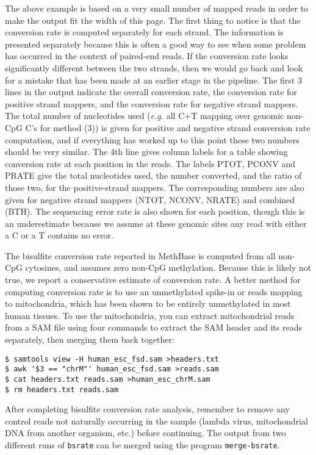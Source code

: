 \documentclass[10pt]{article}
\newcommand{\prog}[1]{\texttt{#1}}
\begin{document}
\noindent
The above example is based on a very small number of mapped reads in
order to make the output fit the width of this page.  The first thing
to notice is that the conversion rate is computed separately for each
strand. The information is presented separately because this is often
a good way to see when some problem has occurred in the context of
paired-end reads. If the conversion rate looks significantly different
between the two strands, then we would go back and look for a mistake
that has been made at an earlier stage in the pipeline. The first 3
lines in the output indicate the overall conversion rate, the
conversion rate for positive strand mappers, and the conversion rate
for negative strand mappers. The total number of nucleotides used
({\em e.g.} all C+T mapping over genomic non-CpG C's for method (3)) is
given for positive and negative strand conversion rate computation,
and if everything has worked up to this point these two numbers should
be very similar. The 4th line gives column labels for a table showing
conversion rate at each position in the reads.  The labels PTOT, PCONV
and PRATE give the total nucleotides used, the number converted, and
the ratio of those two, for the positive-strand mappers. The
corresponding numbers are also given for negative strand mappers
(NTOT, NCONV, NRATE) and combined (BTH). The sequencing error rate is
also shown for each position, though this is an underestimate because
we assume at these genomic sites any read with either a C or a T
contains no error.

The bisulfite conversion rate reported in MethBase is computed from all
non-CpG cytosines, and assumes zero non-CpG methylation. Because this is
likely not true, we report a conservative estimate of conversion rate. A
better method for computing conversion rate is to use an unmethylated
spike-in or reads mapping to mitochondria, which has been shown to be
entirely unmethylated in most human tissues. To use the mitochondria,
you can extract mitochondrial reads from a SAM file using four
commands to extract the SAM header and its reads separately, then merging them
back together:

\begin{verbatim}
$ samtools view -H human_esc_fsd.sam >headers.txt
$ awk '$3 == "chrM"' human_esc_fsd.sam >reads.sam
$ cat headers.txt reads.sam >human_esc_chrM.sam
$ rm headers.txt reads.sam
\end{verbatim}

After completing bisulfite conversion rate analysis, remember to
remove any control reads not naturally occurring in the sample
(lambda virus, mitochondrial DNA from another organism, etc.)
before continuing. The output from two different runs of \prog{bsrate}
can be merged using the program \prog{merge-bsrate}.
\end{document}
